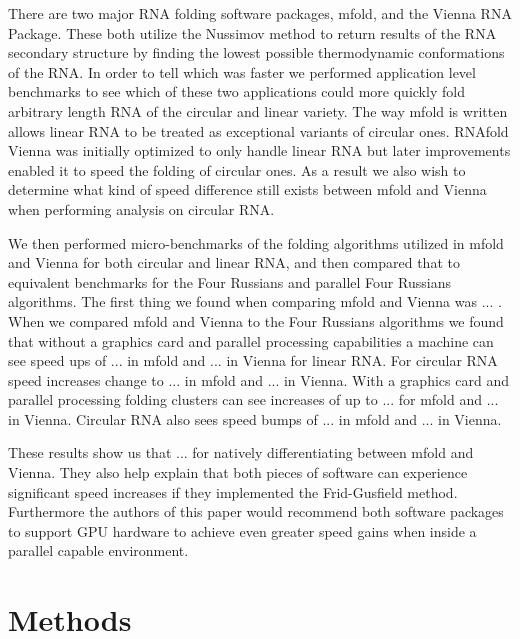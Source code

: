 \documentclass[12pt]{article}
\begin{document}
\par There are two major RNA folding software packages, mfold\cite{zuker1989,zuker1981}, and the Vienna RNA Package\cite{vienna}. These both utilize the Nussimov method to return results of the RNA secondary structure by finding the lowest possible thermodynamic conformations of the RNA\cite{zuker1981,vienna}. In order to tell which was faster we performed application level benchmarks\cite{eulogy} to see which of these two applications could more quickly fold arbitrary length RNA of the circular and linear variety. The way mfold is written allows linear RNA to be treated as exceptional variants of circular ones\cite{circular}. RNAfold Vienna was initially optimized to only handle linear RNA\cite{circular} but later improvements enabled it to speed the folding of circular ones\cite{circular}. As a result we also wish to determine what kind of speed difference still exists between mfold and Vienna when performing analysis on circular RNA.

\par We then performed micro-benchmarks\cite{sysperformance} of the folding algorithms utilized in mfold and Vienna for both circular and linear RNA, and then compared that to equivalent benchmarks for the Four Russians and parallel Four Russians algorithms. The first thing we found when comparing mfold and Vienna was ... . When we compared mfold and Vienna to the Four Russians algorithms we found that without a graphics card and parallel processing capabilities a machine can see speed ups of ... in mfold and ... in Vienna for linear RNA. For circular RNA speed increases change to ... in mfold and ... in Vienna. With a graphics card and parallel processing folding clusters can see increases of up to ... for mfold and ... in Vienna. Circular RNA also sees speed bumps of ... in mfold and ... in Vienna.
\par These results show us that ... for natively differentiating between mfold and Vienna. They also help explain that both pieces of software can experience significant speed increases if they implemented the Frid-Gusfield method. Furthermore the authors of this paper would recommend both software packages to support GPU hardware to achieve even greater speed gains when inside a parallel capable environment.

\section{Methods}
\end{document}
